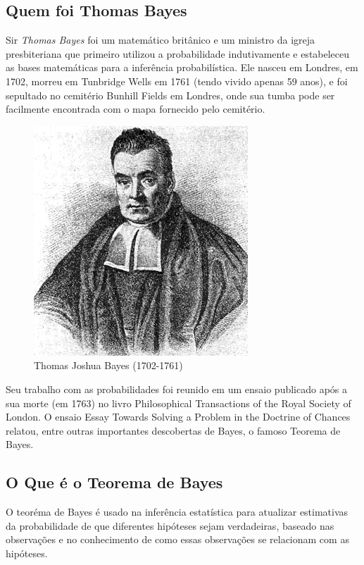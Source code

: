 \subsection{Quem foi Thomas Bayes}

Sir \emph{Thomas Bayes} foi um matemático britânico e um ministro
da igreja presbiteriana que primeiro utilizou a probabilidade
indutivamente e estabeleceu as bases matemáticas para a inferência
probabilística. Ele nasceu em Londres, em 1702, morreu em
Tunbridge Wells em 1761 (tendo vivido apenas 59 anos), e foi
sepultado no cemitério Bunhill Fields em Londres, onde sua tumba
pode ser facilmente encontrada com o mapa fornecido pelo
cemitério.


\vspace{-1.8cm}
\begin{figure}
    \centering
    \includegraphics[scale=0.6]{figures/Thomas_Bayes.jpeg}
    \caption{Thomas Joshua Bayes (1702-1761)}
    \label{fig:my_label2}
\end{figure}



Seu trabalho com as probabilidades foi reunido em um ensaio
publicado após a sua morte (em 1763) no livro Philosophical
Transactions of the Royal Society of London. O ensaio Essay
Towards Solving a Problem in the Doctrine of Chances relatou,
entre outras importantes descobertas de Bayes, o famoso Teorema de
Bayes.

\subsection{ O Que é o Teorema de Bayes}

O teoréma de Bayes é usado na inferência estatística para
atualizar estimativas da probabilidade de que diferentes hipóteses
sejam verdadeiras, baseado nas observações e no conhecimento de
como essas observações se relacionam com as hipóteses.\vskip0.3cm

